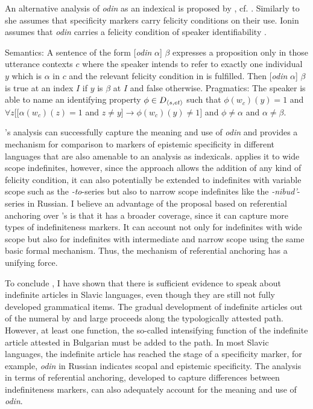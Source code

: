 \documentclass[output=paper,colorlinks,citecolor=brown]{langscibook}
\begin{document}
An alternative analysis of \textit{odin} as an indexical is proposed by \citet{Ionin2013}, cf. . Similarly to \citet{Kagan2011} she assumes that specificity markers carry felicity conditions on their use. Ionin assumes that \textit{odin} carries a felicity condition of speaker identifiability . 

\eanoraggedright
\eanoraggedright\label{geist:ex:ionin-sem-a}
Semantics: A sentence of the form [\textit{odin} $\alpha$] $\beta$ expresses a proposition only in those utterance contexts $c$ where the speaker intends to refer to exactly one individual $y$ which is $\alpha$ in $c$ and the relevant felicity condition in  is fulfilled. Then [\textit{odin} $\alpha$] $\beta$ is true at an index $I$ if $y$ is $\beta$ at $I$ and false otherwise.
\ex\label{geist:ex:ionin-sem-b}
Pragmatics: The speaker is able to name an identifying property $\phi\in D_{\langle{s,et}\rangle}$ such that $\phi(w_c)(y) = 1$ and $\forall z[[\alpha(w_c)(z)=1$ and $z\neq y] \rightarrow\phi(w_c)(y)\neq 1]$ and $\phi\neq\alpha$ and $\alpha\neq\beta$.
\begin{xlist}
    \exi{}{\xspace\hfill\citep[82]{Ionin2013}}
\end{xlist}
\z\z

\noindent \citeauthor{Ionin2013}’s analysis can successfully capture the meaning and use of \textit{odin} and provides a mechanism for comparison to markers of epistemic specificity in different languages that are also amenable to an analysis as indexicals. \citet{Ionin2013} applies it to wide scope indefinites, however, since the approach allows the addition of any kind of felicity condition, it can also potentially be extended to indefinites with variable scope such as the \textit{-to}-series but also to narrow scope indefinites like the \textit{-nibud’}-series in Russian. I believe an advantage of the proposal based on referential anchoring over \citeauthor{Ionin2013}’s is that it has a broader coverage, since it can capture more types of indefiniteness markers. It can account not only for indefinites with wide scope but also for indefinites with intermediate and narrow scope using the same basic formal mechanism. Thus, the mechanism of referential anchoring has a unifying force.

To conclude , I have shown that there is sufficient evidence to speak about indefinite articles in Slavic languages, even though they are still not fully developed grammatical items. The gradual development of indefinite articles out of the numeral by and large proceeds along the typologically attested path. However, at least one function, the so-called intensifying function of the indefinite article attested in Bulgarian must be added to the path. In most Slavic languages, the indefinite article has reached the stage of a specificity marker, for example, \textit{odin} in Russian indicates scopal and epistemic specificity. The analysis in terms of referential anchoring, developed to capture differences between indefiniteness markers, can also adequately account for the meaning and use of \textit{odin}.
\end{document}

